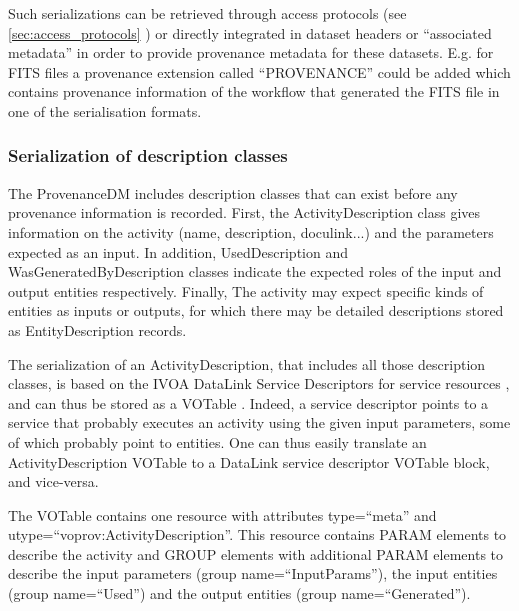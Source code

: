 Such serializations can be retrieved through access protocols (see \ref{sec:access_protocols} ) or directly integrated in dataset headers or ``associated metadata'' in order to provide provenance metadata for these datasets. E.g. for FITS files a provenance extension called ``PROVENANCE'' could be added which contains provenance information of the workflow that generated the FITS file in one of the serialisation formats.





\subsubsection{Serialization of description classes}\label{sec:description-serialization}

The ProvenanceDM includes description classes that can exist before any provenance information is recorded. First, the ActivityDescription class gives information on the activity (name, description, doculink...) and the parameters expected as an input. In addition, UsedDescription and WasGeneratedByDescription classes indicate the expected roles of the input and output entities respectively. Finally, The activity may expect specific kinds of entities as inputs or outputs, for which there may be detailed descriptions stored as EntityDescription records.

The serialization of an ActivityDescription, that includes all those description classes, is based on the IVOA DataLink Service Descriptors for service resources \citep{std:Datalink}, and can thus be stored as a VOTable  \citep{std:VOTABLE}. Indeed, a service descriptor points to a service that probably executes an activity using the given input parameters, some of which probably point to entities. One can thus easily translate an ActivityDescription VOTable to a DataLink service descriptor VOTable block, and vice-versa. 

The VOTable contains one resource with attributes type=``meta'' and utype=``voprov:ActivityDescription''. This resource contains PARAM elements to describe the activity and GROUP elements with additional PARAM elements to describe the input parameters (group name=``InputParams''), the input entities (group name=``Used'') and the output entities (group name=``Generated''). 

